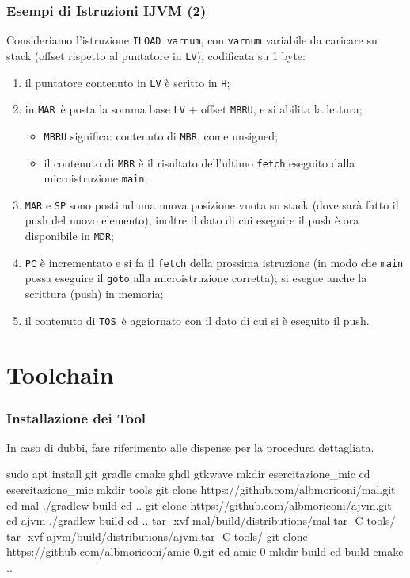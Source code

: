 \documentclass{beamer}
\begin{document}
\begin{frame}
  \frametitle{Esempi di Istruzioni IJVM (2)}
  Consideriamo l'istruzione \lstinline{ILOAD varnum}, con \lstinline{varnum}
  variabile da caricare su stack (offset rispetto al puntatore in
  \lstinline{LV}), codificata su 1 byte:
  \begin{enumerate}
    \item il puntatore contenuto in \lstinline{LV} è scritto in \lstinline{H};
    \item in \lstinline{MAR} è posta la somma base \lstinline{LV} + offset
    \lstinline{MBRU}, e si abilita la lettura;
    \begin{itemize}
      \item \lstinline{MBRU} significa: contenuto di \lstinline{MBR}, come
      unsigned;
      \item il contenuto di \lstinline{MBR} è il risultato dell'ultimo
      \lstinline{fetch} eseguito dalla microistruzione \lstinline{main};
    \end{itemize}
    \item \lstinline{MAR} e \lstinline{SP} sono posti ad una nuova posizione
    vuota su stack (dove sarà fatto il push del nuovo elemento); inoltre il dato
    di cui eseguire il push è ora disponibile in \lstinline{MDR};
    \item \lstinline{PC} è incrementato e si fa il \lstinline{fetch} della
    prossima istruzione (in modo che \lstinline{main} possa eseguire il
    \lstinline{goto} alla microistruzione corretta); si esegue anche la
    scrittura (push) in memoria;
    \item il contenuto di \lstinline{TOS} è aggiornato con il dato di cui si è
    eseguito il push.
  \end{enumerate}
\end{frame}
 
\section{Toolchain}
\begin{frame}[fragile]
  \frametitle{Installazione dei Tool}
  In caso di dubbi, fare riferimento alle dispense per la procedura dettagliata.
\begin{commandshell}
sudo apt install git gradle cmake ghdl gtkwave
mkdir esercitazione_mic
cd esercitazione_mic
mkdir tools
git clone https://github.com/albmoriconi/mal.git
cd mal
./gradlew build
cd ..
git clone https://github.com/albmoriconi/ajvm.git
cd ajvm
./gradlew build
cd ..
tar -xvf mal/build/distributions/mal.tar -C tools/
tar -xvf ajvm/build/distributions/ajvm.tar -C tools/
git clone https://github.com/albmoriconi/amic-0.git
cd amic-0
mkdir build
cd build
cmake ..
\end{commandshell}
\end{frame}
\end{document}
